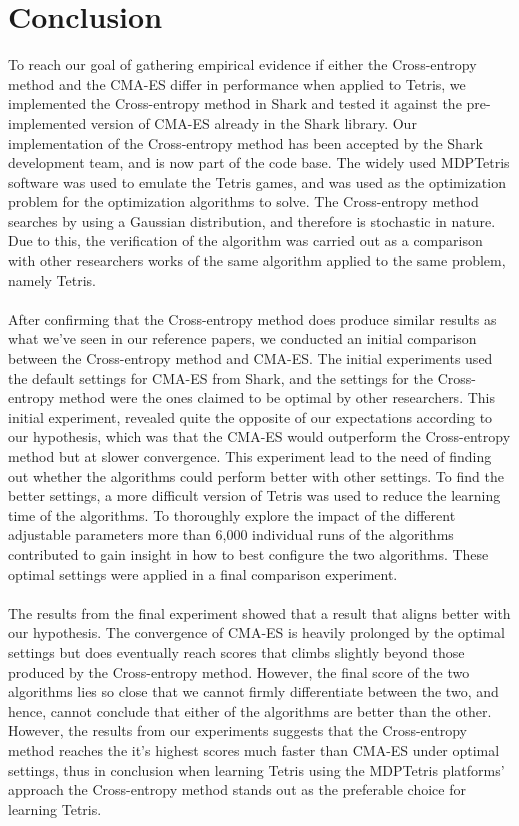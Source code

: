 \section{Conclusion}

To reach our goal of gathering empirical evidence if either the Cross-entropy method
and the CMA-ES differ in performance when applied to Tetris, we implemented the Cross-entropy method in Shark and tested it against the pre-implemented version of CMA-ES
already in the Shark library. Our implementation of the Cross-entropy 
method has been accepted by the Shark development team, and is now part of the code base.
The widely used MDPTetris software was used to emulate the
Tetris games, and was used as the optimization problem for the optimization algorithms to solve.
The Cross-entropy method searches by using a Gaussian 
distribution, and therefore is stochastic in nature. Due to this, 
the verification of the algorithm was carried out as a comparison with other 
researchers works of the same algorithm applied to the same problem, namely Tetris.\\
\\
After confirming that the Cross-entropy method does produce similar results as 
what we've seen in our reference papers, we conducted an initial comparison between the
Cross-entropy method and CMA-ES. The initial experiments used the default settings for CMA-ES
from Shark,
and the settings for the Cross-entropy method were the ones claimed to be optimal by other 
researchers. This initial experiment, revealed quite the opposite of our expectations 
according to our hypothesis, which was that the CMA-ES would outperform the Cross-entropy method
but at slower convergence. This experiment lead to the need of finding out whether the algorithms
could perform better with other settings. To find the better settings, a more difficult version
of Tetris was used to reduce the learning time of the algorithms. To thoroughly explore 
the impact of the different adjustable parameters more than 6,000 individual runs of the 
algorithms contributed to gain insight in how to best configure the two algorithms. These 
optimal settings were applied in a final comparison experiment.\\
\\
The results from the final experiment showed that a result that aligns better with our
hypothesis. The convergence of CMA-ES is heavily prolonged by the optimal settings
but does eventually reach scores that climbs slightly beyond those produced by the
Cross-entropy method. However, the final score of the two algorithms lies so close that
we cannot firmly differentiate between the two, and hence, cannot conclude that either of the
algorithms are better than the other. However, the results from our experiments 
suggests that the Cross-entropy method reaches the 
it's highest scores much faster than CMA-ES under optimal settings, thus in conclusion
when learning Tetris using the MDPTetris platforms' approach the Cross-entropy method 
stands out as the preferable choice for learning Tetris.

